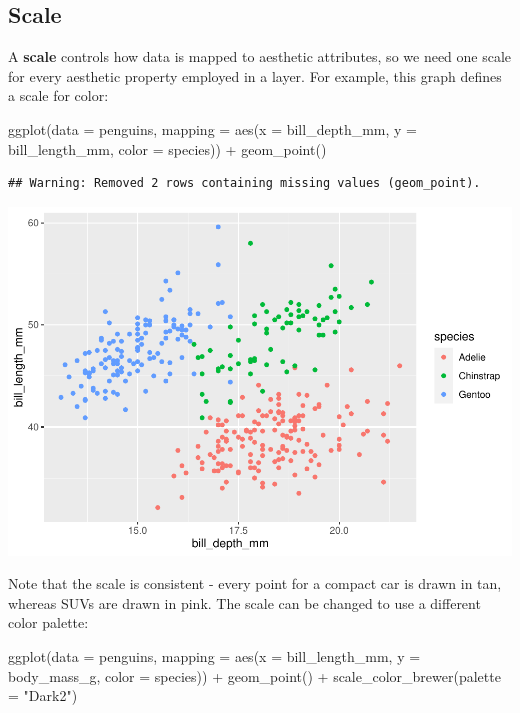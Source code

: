 \documentclass[
]{article}
\newenvironment{Shaded}{\begin{snugshade}}{\end{snugshade}}
\newcommand{\AttributeTok}[1]{\textcolor[rgb]{0.77,0.63,0.00}{#1}}
\newcommand{\FunctionTok}[1]{\textcolor[rgb]{0.00,0.00,0.00}{#1}}
\newcommand{\NormalTok}[1]{#1}
\newcommand{\SpecialCharTok}[1]{\textcolor[rgb]{0.00,0.00,0.00}{#1}}
\newcommand{\StringTok}[1]{\textcolor[rgb]{0.31,0.60,0.02}{#1}}
\begin{document}
\hypertarget{scale}{%
\subsection{Scale}\label{scale}}

A \textbf{scale} controls how data is mapped to aesthetic attributes, so
we need one scale for every aesthetic property employed in a layer. For
example, this graph defines a scale for color:

\begin{Shaded}
\begin{Highlighting}[]
\FunctionTok{ggplot}\NormalTok{(}\AttributeTok{data =}\NormalTok{ penguins, }\AttributeTok{mapping =} \FunctionTok{aes}\NormalTok{(}\AttributeTok{x =}\NormalTok{ bill\_depth\_mm, }\AttributeTok{y =}\NormalTok{ bill\_length\_mm, }\AttributeTok{color =}\NormalTok{ species)) }\SpecialCharTok{+}
  \FunctionTok{geom\_point}\NormalTok{() }
\end{Highlighting}
\end{Shaded}

\begin{verbatim}
## Warning: Removed 2 rows containing missing values (geom_point).
\end{verbatim}

\includegraphics{Grammar-of-Graphics_files/figure-latex/scale_color-1.pdf}

Note that the scale is consistent - every point for a compact car is
drawn in tan, whereas SUVs are drawn in pink. The scale can be changed
to use a different color palette:

\begin{Shaded}
\begin{Highlighting}[]
\FunctionTok{ggplot}\NormalTok{(}\AttributeTok{data =}\NormalTok{ penguins, }\AttributeTok{mapping =} \FunctionTok{aes}\NormalTok{(}\AttributeTok{x =}\NormalTok{ bill\_length\_mm, }\AttributeTok{y =}\NormalTok{ body\_mass\_g, }\AttributeTok{color =}\NormalTok{ species)) }\SpecialCharTok{+}
  \FunctionTok{geom\_point}\NormalTok{() }\SpecialCharTok{+}
  \FunctionTok{scale\_color\_brewer}\NormalTok{(}\AttributeTok{palette =} \StringTok{"Dark2"}\NormalTok{)}
\end{Highlighting}
\end{Shaded}
\end{document}
